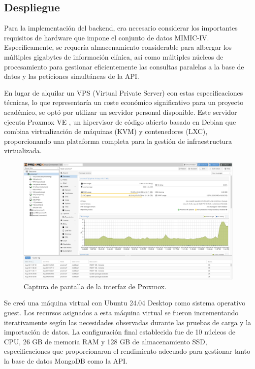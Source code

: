 \subsection{Despliegue}

Para la implementación del backend, era necesario considerar los importantes requisitos de hardware que impone el conjunto de datos MIMIC-IV. Específicamente, se requería almacenamiento considerable para albergar los múltiples gigabytes de información clínica, así como múltiples núcleos de procesamiento para gestionar eficientemente las consultas paralelas a la base de datos y las peticiones simultáneas de la API.

En lugar de alquilar un VPS (Virtual Private Server) con estas especificaciones técnicas, lo que representaría un coste económico significativo para un proyecto académico, se optó por utilizar un servidor personal disponible. Este servidor ejecuta Proxmox VE \cite{proxmox}, un hipervisor de código abierto basado en Debian que combina virtualización de máquinas (KVM) y contenedores (LXC), proporcionando una plataforma completa para la gestión de infraestructura virtualizada.


\begin{figure}[H]
  \centering
  \includegraphics[width=1\textwidth]{imagenes/proxmox2.png}
  \caption{Captura de pantalla de la interfaz de Proxmox.}
  \label{fig:proxmox2}
\end{figure}



Se creó una máquina virtual con Ubuntu 24.04 Desktop como sistema operativo guest. Los recursos asignados a esta máquina virtual se fueron incrementando iterativamente según las necesidades observadas durante las pruebas de carga y la importación de datos. La configuración final establecida fue de 10 núcleos de CPU, 26 GB de memoria RAM y 128 GB de almacenamiento SSD, especificaciones que proporcionaron el rendimiento adecuado para gestionar tanto la base de datos MongoDB como la API.

